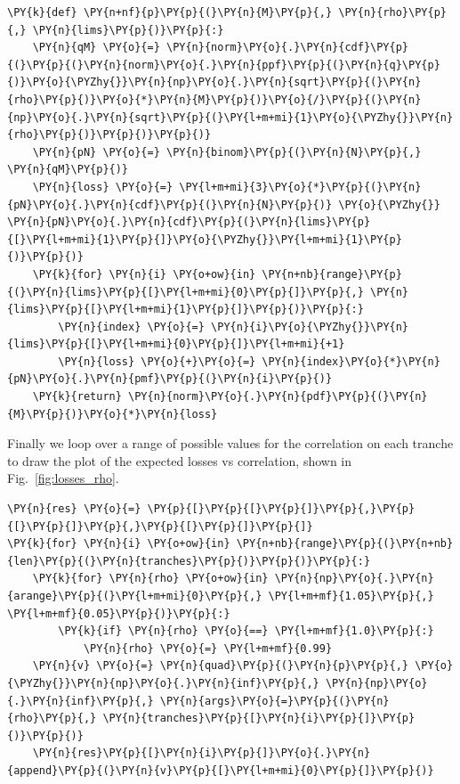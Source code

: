 \begin{codebox}
\begin{Verbatim}[commandchars=\\\{\}]
\PY{k}{def} \PY{n+nf}{p}\PY{p}{(}\PY{n}{M}\PY{p}{,} \PY{n}{rho}\PY{p}{,} \PY{n}{lims}\PY{p}{)}\PY{p}{:}
    \PY{n}{qM} \PY{o}{=} \PY{n}{norm}\PY{o}{.}\PY{n}{cdf}\PY{p}{(}\PY{p}{(}\PY{n}{norm}\PY{o}{.}\PY{n}{ppf}\PY{p}{(}\PY{n}{q}\PY{p}{)}\PY{o}{\PYZhy{}}\PY{n}{np}\PY{o}{.}\PY{n}{sqrt}\PY{p}{(}\PY{n}{rho}\PY{p}{)}\PY{o}{*}\PY{n}{M}\PY{p}{)}\PY{o}{/}\PY{p}{(}\PY{n}{np}\PY{o}{.}\PY{n}{sqrt}\PY{p}{(}\PY{l+m+mi}{1}\PY{o}{\PYZhy{}}\PY{n}{rho}\PY{p}{)}\PY{p}{)}\PY{p}{)}
    \PY{n}{pN} \PY{o}{=} \PY{n}{binom}\PY{p}{(}\PY{n}{N}\PY{p}{,} \PY{n}{qM}\PY{p}{)}
    \PY{n}{loss} \PY{o}{=} \PY{l+m+mi}{3}\PY{o}{*}\PY{p}{(}\PY{n}{pN}\PY{o}{.}\PY{n}{cdf}\PY{p}{(}\PY{n}{N}\PY{p}{)} \PY{o}{\PYZhy{}} \PY{n}{pN}\PY{o}{.}\PY{n}{cdf}\PY{p}{(}\PY{n}{lims}\PY{p}{[}\PY{l+m+mi}{1}\PY{p}{]}\PY{o}{\PYZhy{}}\PY{l+m+mi}{1}\PY{p}{)}\PY{p}{)}
    \PY{k}{for} \PY{n}{i} \PY{o+ow}{in} \PY{n+nb}{range}\PY{p}{(}\PY{n}{lims}\PY{p}{[}\PY{l+m+mi}{0}\PY{p}{]}\PY{p}{,} \PY{n}{lims}\PY{p}{[}\PY{l+m+mi}{1}\PY{p}{]}\PY{p}{)}\PY{p}{:}
        \PY{n}{index} \PY{o}{=} \PY{n}{i}\PY{o}{\PYZhy{}}\PY{n}{lims}\PY{p}{[}\PY{l+m+mi}{0}\PY{p}{]}\PY{l+m+mi}{+1}
        \PY{n}{loss} \PY{o}{+}\PY{o}{=} \PY{n}{index}\PY{o}{*}\PY{n}{pN}\PY{o}{.}\PY{n}{pmf}\PY{p}{(}\PY{n}{i}\PY{p}{)}  
    \PY{k}{return} \PY{n}{norm}\PY{o}{.}\PY{n}{pdf}\PY{p}{(}\PY{n}{M}\PY{p}{)}\PY{o}{*}\PY{n}{loss}
\end{Verbatim}
\end{codebox}

Finally we loop over a range of possible values for the correlation on each tranche to draw the plot of the expected losses vs correlation, shown in Fig.~\ref{fig:losses_rho}.

\begin{codebox}
\begin{Verbatim}[commandchars=\\\{\}]
\PY{n}{res} \PY{o}{=} \PY{p}{[}\PY{p}{[}\PY{p}{]}\PY{p}{,}\PY{p}{[}\PY{p}{]}\PY{p}{,}\PY{p}{[}\PY{p}{]}\PY{p}{]}
\PY{k}{for} \PY{n}{i} \PY{o+ow}{in} \PY{n+nb}{range}\PY{p}{(}\PY{n+nb}{len}\PY{p}{(}\PY{n}{tranches}\PY{p}{)}\PY{p}{)}\PY{p}{:}
    \PY{k}{for} \PY{n}{rho} \PY{o+ow}{in} \PY{n}{np}\PY{o}{.}\PY{n}{arange}\PY{p}{(}\PY{l+m+mi}{0}\PY{p}{,} \PY{l+m+mf}{1.05}\PY{p}{,} \PY{l+m+mf}{0.05}\PY{p}{)}\PY{p}{:}
        \PY{k}{if} \PY{n}{rho} \PY{o}{==} \PY{l+m+mf}{1.0}\PY{p}{:}
            \PY{n}{rho} \PY{o}{=} \PY{l+m+mf}{0.99}
    \PY{n}{v} \PY{o}{=} \PY{n}{quad}\PY{p}{(}\PY{n}{p}\PY{p}{,} \PY{o}{\PYZhy{}}\PY{n}{np}\PY{o}{.}\PY{n}{inf}\PY{p}{,} \PY{n}{np}\PY{o}{.}\PY{n}{inf}\PY{p}{,} \PY{n}{args}\PY{o}{=}\PY{p}{(}\PY{n}{rho}\PY{p}{,} \PY{n}{tranches}\PY{p}{[}\PY{n}{i}\PY{p}{]}\PY{p}{)}\PY{p}{)}
    \PY{n}{res}\PY{p}{[}\PY{n}{i}\PY{p}{]}\PY{o}{.}\PY{n}{append}\PY{p}{(}\PY{n}{v}\PY{p}{[}\PY{l+m+mi}{0}\PY{p}{]}\PY{p}{)}
\end{Verbatim}
\end{codebox}

